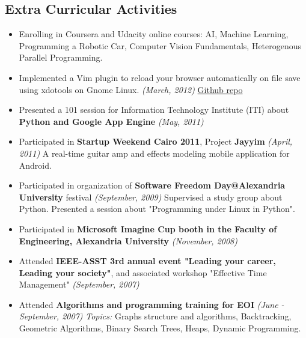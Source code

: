 \documentclass{res}
\newcommand{\interval}[1]{\textit{(#1)} }
\begin{document}
\begin{resume}
\section{Extra Curricular Activities}
    \begin{itemize}
    \item Enrolling in Coursera and Udacity online courses: AI, Machine Learning, Programming a Robotic Car, Computer Vision Fundamentals, Heterogenous Parallel Programming.
    \item Implemented a Vim plugin to reload your browser automatically on file save using xdotools on Gnome Linux. \interval{March, 2012} \href{https://github.com/lordm/vim-browser-reload-linux}{Github repo}
    \item Presented a 101 session for Information Technology Institute (ITI) about \textbf{Python and Google App Engine} \interval{May, 2011}
    \item Participated in \textbf{Startup Weekend Cairo 2011}, Project \textbf{Jayyim} \interval{April, 2011}
      \subitem A real-time guitar amp and effects modeling mobile application for Android.
    \item Participated in organization of \textbf{Software Freedom Day@Alexandria University} festival \interval{September, 2009}
      \subitem Supervised a study group about Python.
      \subitem Presented a session about "Programming under Linux in Python".
    \item Participated in \textbf{Microsoft Imagine Cup booth in the Faculty of Engineering, Alexandria University} \interval{November, 2008}
    \item Attended \textbf{IEEE-ASST 3rd annual event "Leading your career, Leading your society"}, and associated workshop "Effective Time Management" \interval{September, 2007}
    \item Attended \textbf{Algorithms and programming training for EOI} \interval{June - September, 2007}
      \subitem \textit{Topics:} Graphs structure and algorithms, Backtracking, Geometric Algorithms, Binary Search Trees, Heaps, Dynamic Programming.
    \end{itemize}


\end{resume}
\end{document}
